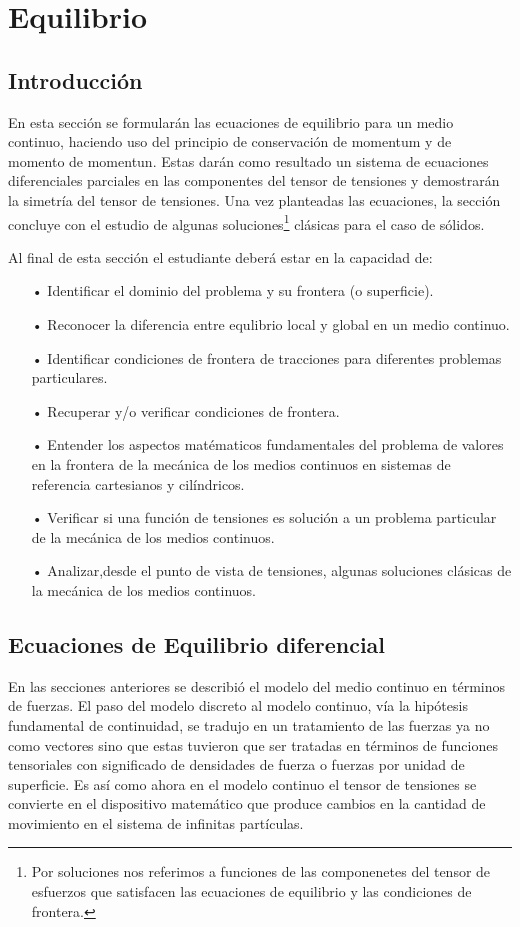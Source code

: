 \documentclass[../notas medios.tex]{subfiles}
\begin{document}
\chapter{Equilibrio}

\graphicspath{{img/Cap4/}} 								 %
\section{Introducción}

En esta sección se formularán las ecuaciones de equilibrio para un medio continuo, haciendo uso del principio de conservación de momentum y de momento de momentun. Estas darán como resultado un sistema de ecuaciones diferenciales parciales en las componentes del tensor de tensiones y demostrarán la simetría del tensor de tensiones. Una vez planteadas las ecuaciones, la sección concluye con el estudio de algunas soluciones\footnote{Por soluciones nos referimos a funciones de las componenetes del tensor de esfuerzos que satisfacen las ecuaciones de equilibrio y las condiciones de frontera.} clásicas para el caso de sólidos.

Al final de esta sección el estudiante deberá estar en la capacidad de:

\begin{itemize}
\item[•] Identificar el dominio del problema y su frontera (o superficie).
\item[•] Reconocer la diferencia entre equlibrio local y global en un medio continuo.
\item[•] Identificar condiciones de frontera de tracciones para diferentes problemas particulares.
\item[•] Recuperar y/o verificar condiciones de frontera.
\item[•] Entender los aspectos matématicos fundamentales del problema de valores en la frontera de la mecánica de los medios continuos en sistemas de referencia cartesianos y cilíndricos.
\item[•] Verificar si una función de tensiones es solución a un problema particular de la mecánica de los medios continuos.
\item[•] Analizar,desde el punto de vista de tensiones, algunas soluciones clásicas de la mecánica de los medios continuos.
\end{itemize}


\section{Ecuaciones de Equilibrio diferencial}
En las secciones anteriores se describió el modelo del medio continuo en términos de fuerzas.  El paso del modelo discreto al modelo continuo, vía la hipótesis fundamental de continuidad, se tradujo en un tratamiento de las fuerzas ya no como vectores sino que estas tuvieron que ser tratadas en términos de funciones tensoriales con significado de densidades de fuerza o fuerzas por unidad de superficie.  Es así como ahora en el modelo continuo el tensor de tensiones se convierte en el dispositivo matemático que produce cambios en la cantidad de movimiento en el sistema de infinitas partículas.
\end{document}
